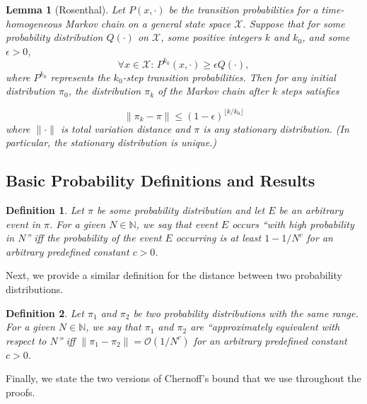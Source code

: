 \documentclass[11pt]{article}
\newtheorem{definition}{Definition}
\newtheorem{lemma}[theorem]{Lemma}
\newcommand{\N}{\mathbb{N}}
\newcommand{\BO}{\mathcal{O}}
\begin{document}
\begin{lemma}[Rosenthal]
\label{lem:rosenthal}
	Let $P(x,\cdot)$ be the transition probabilities for a time-homogeneous Markov chain on a general state space $\mathcal{X}$. Suppose that for some probability distribution $Q(\cdot)$ on $\mathcal{X}$, some positive integers $k$ and $k_0$, and some $\epsilon > 0$, 
	\begin{equation*}
		\forall x \in \mathcal{X}:\,P^{k_0}(x,\cdot) \geq \epsilon Q(\cdot) ,
	\end{equation*}		
where $P^{k_0}$ represents the $k_0$-step transition probabilities. 
Then for any initial distribution $\pi_0$, the distribution $\pi_k$ of the Markov chain after $k$ steps satisfies

	\begin{equation*}
		\|\pi_k - \pi\|\leq (1 - \epsilon)^{\lfloor k/k_0 \rfloor}
	\end{equation*} 
where $\| \cdot \|$ is total variation distance and $\pi$ is any stationary distribution. (In particular, the stationary distribution is unique.)
\end{lemma}


\subsection{Basic Probability Definitions and Results}



\begin{definition}
\label{def:whp}
	Let $\pi$ be some probability distribution and let $E$ be an arbitrary event in $\pi$. For a given $N\in \N$, we say that event $E$ occurs ``with high probability in $N$'' iff the probability of the event $E$ occurring is at least $1 - 1 / N^c$ for an arbitrary predefined constant $c > 0$.
\end{definition}


Next, we provide a similar definition for the distance between two probability distributions.

\begin{definition}
	Let $\pi_1$ and $\pi_2$ be two probability distributions with the same range. For a given $N \in \N$, we say that $\pi_1$ and $\pi_2$ are ``approximately equivalent with respect to $N$'' iff $\|\pi_1 - \pi_2\| = \BO(1/N^c)$ for an arbitrary predefined constant $c > 0$.
\end{definition}	
	Finally, we state the two versions of Chernoff's bound that we use throughout the proofs.
	
\end{document}
